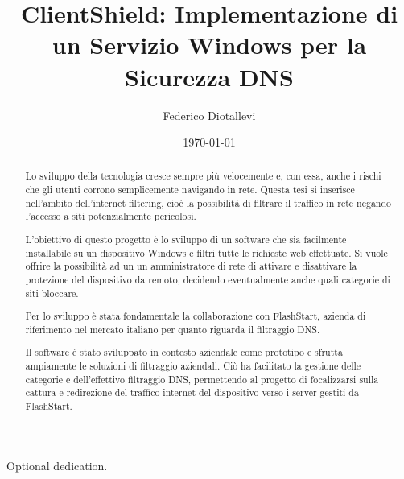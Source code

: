 \documentclass[12pt,a4paper,openright,twoside]{book}
\title{ClientShield: Implementazione di un Servizio Windows per la Sicurezza DNS}
\author{Federico Diotallevi}
\date{\today}
\begin{document}
\frontmatter\frontispiece\

\renewcommand{\abstractname}{Sommario}
\begin{abstract}

Lo sviluppo della tecnologia cresce sempre più velocemente e, con essa, anche i rischi che gli utenti corrono semplicemente navigando in rete.
Questa tesi si inserisce nell'ambito dell'internet filtering, cioè la possibilità di filtrare il traffico in rete negando l'accesso a siti potenzialmente pericolosi.

L'obiettivo di questo progetto è lo sviluppo di un software che sia facilmente installabile su un dispositivo Windows e filtri tutte le richieste web effettuate.
Si vuole offrire la possibilità ad un un amministratore di rete di attivare e disattivare la protezione del dispositivo da remoto, decidendo eventualmente anche quali categorie di siti bloccare.

Per lo sviluppo è stata fondamentale la collaborazione con FlashStart, azienda di riferimento nel mercato italiano per quanto riguarda il filtraggio \gls{DNS}.

Il software è stato sviluppato in contesto aziendale come prototipo e sfrutta ampiamente le soluzioni di filtraggio aziendali.
Ciò ha facilitato la gestione delle categorie e dell'effettivo filtraggio \gls{DNS}, permettendo al progetto di focalizzarsi sulla cattura e redirezione del traffico internet del dispositivo verso i server gestiti da FlashStart.
\end{abstract}

\begin{dedication}
Optional dedication.
\end{dedication}

\tableofcontents   





\label{chap:introduzione}
\end{document}
